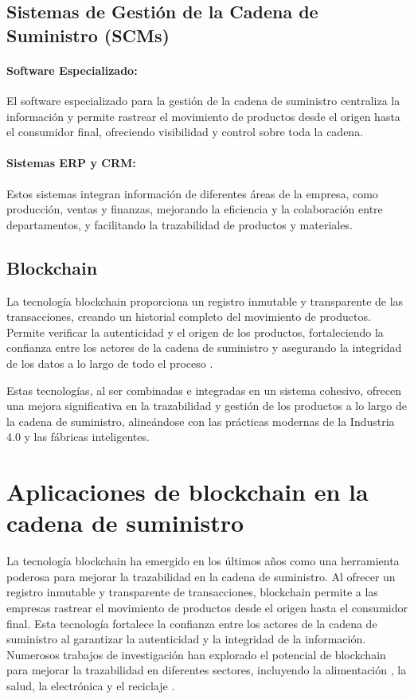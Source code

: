 \documentclass[main.tex]{subfiles}
\begin{document}
\subsection{Sistemas de Gestión de la Cadena de Suministro (SCMs)}

\paragraph{Software Especializado:}

El software especializado para la gestión de la cadena de suministro centraliza la información y permite rastrear el movimiento de productos desde el origen hasta el consumidor final, ofreciendo visibilidad y control sobre toda la cadena.

\paragraph{Sistemas ERP y CRM:}

Estos sistemas integran información de diferentes áreas de la empresa, como producción, ventas y finanzas, mejorando la eficiencia y la colaboración entre departamentos, y facilitando la trazabilidad de productos y materiales.

\subsection{Blockchain}

La tecnología blockchain proporciona un registro inmutable y transparente de las transacciones, creando un historial completo del movimiento de productos. Permite verificar la autenticidad y el origen de los productos, fortaleciendo la confianza entre los actores de la cadena de suministro y asegurando la integridad de los datos a lo largo de todo el proceso \cite{schuitemaker2020product}.

Estas tecnologías, al ser combinadas e integradas en un sistema cohesivo, ofrecen una mejora significativa en la trazabilidad y gestión de los productos a lo largo de la cadena de suministro, alineándose con las prácticas modernas de la Industria 4.0 y las fábricas inteligentes.

\section{Aplicaciones de blockchain en la cadena de suministro}

La tecnología blockchain ha emergido en los últimos años como una herramienta poderosa para mejorar la trazabilidad en la cadena de suministro. Al ofrecer un registro inmutable y transparente de transacciones, blockchain permite a las empresas rastrear el movimiento de productos desde el origen hasta el consumidor final. Esta tecnología fortalece la confianza entre los actores de la cadena de suministro al garantizar la autenticidad y la integridad de la información. Numerosos trabajos de investigación han explorado el potencial de blockchain para mejorar la trazabilidad en diferentes sectores, incluyendo la alimentación \cite{ibmfoodtrust2024}, la salud, la electrónica y el reciclaje \cite{tang2024statistical, baralla2023waste}.
\end{document}
